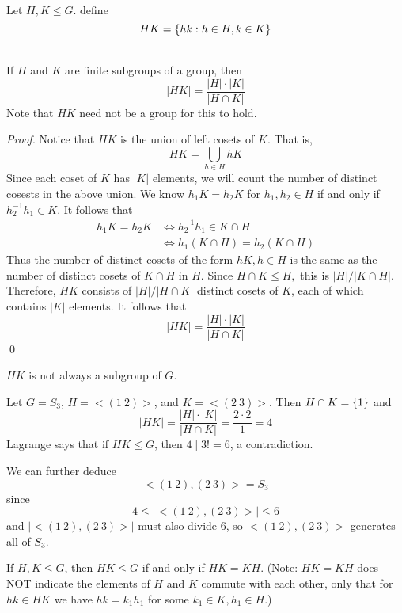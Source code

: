 \begin{definition} \leavevmode \\
    Let $H, K \leq G$. define
    $$HK = \left\{hk : h \in H, k \in K\right\}$$
\end{definition}

\begin{theorem}  \leavevmode \\
    If $H$ and $K$ are finite subgroups of a group, then
    $$|HK| = \frac{|H| \cdot |K|}{|H\cap K|}$$
    Note that $HK$ need not be a group for this to hold.
\end{theorem}

\begin{proof}
    Notice that $HK$ is the union of left cosets of $K$. That is,
    $$HK = \bigcup \limits_{h \in H}hK$$
    Since each coset of $K$ has $|K|$ elements, we will count the number of distinct cosests in the above union. We know $h_1K = h_2K$ for $h_1, h_2\in H$ if and only if $h_2^{-1}h_1 \in K.$ It follows that 
    \begin{align*}
        h_1K = h_2K &\iff h_2^{-1}h_1 \in K\cap H \\
        &\iff h_1\left(K\cap H\right) = h_2 \left(K \cap H\right)
    \end{align*}
    Thus the number of distinct cosets of the form $hK, h \in H$ is the same as the number of distinct cosets of $K\cap H$ in $H$. Since $H\cap K \leq H,$ this is $|H|/|K\cap H|$. Therefore, $HK$ consists of $|H|/|H\cap K|$ distinct cosets of $K$, each of which contains $|K|$ elements. It follows that 
    $$|HK| = \frac{|H|\cdot |K|}{|H\cap K|}$$
    \qed
\end{proof}

$HK$ is not always a subgroup of $G$.

\begin{example}
    Let $G = S_3$, $H=<(1~2)>$, and $K = <(2~3)>.$
    Then $H\cap K = \left\{1\right\}$ and 
    $$|HK| = \frac{|H|\cdot |K|}{|H\cap K|}= \frac{2\cdot 2}{1}=4$$
    Lagrange says that if $HK \leq G$, then $4 \mid 3!=6$, a contradiction.

    We can further deduce
    $$<(1~2),(2~3)> = S_3$$
    since 
    $$4 \leq \left|<(1~2),(2~3)>\right| \leq 6$$
    and $\left|<(1~2), (2~3)>\right|$ must also divide $6$, so $<(1~2), (2~3)>$ generates all of $S_3$.
\end{example}

\begin{proposition}
    If $H,K \leq G$, then $HK \leq G$ if and only if $HK = KH$. (Note: $HK = KH$ does NOT indicate the elements of $H$ and $K$ commute with each other, only that for $hk \in HK$ we have $hk=k_1h_1$ for some $k_1 \in K, h_1 \in H$.)
\end{proposition}

